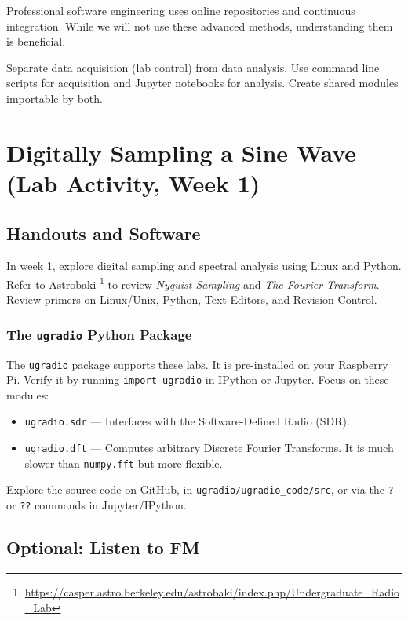 \documentclass[11pt,preprint]{aastex}
\begin{document}
\noindent
Professional software engineering uses online repositories and continuous integration.
While we will not use these advanced methods, understanding them is beneficial.

Separate data acquisition (lab control) from data analysis.
Use command line scripts for acquisition and Jupyter notebooks for analysis.
Create shared modules importable by both.


\section{Digitally Sampling a Sine Wave (Lab Activity, Week 1)}
\label{nyquist}

\subsection{Handouts and Software}

\noindent
In week 1, explore digital sampling and spectral analysis using Linux and Python.
Refer to Astrobaki%
\footnote{\url{https://casper.astro.berkeley.edu/astrobaki/index.php/Undergraduate_Radio_Lab}}
to review {\it Nyquist Sampling} and {\it The Fourier Transform}.
Review primers on Linux/Unix, Python, Text Editors, and Revision Control.

\subsubsection{The {\tt ugradio} Python Package}

\noindent
The {\tt ugradio} package supports these labs.
It is pre-installed on your Raspberry Pi.
Verify it by running {\tt import ugradio} in IPython or Jupyter.
Focus on these modules:

\begin{itemize}
    \item {\tt ugradio.sdr} --- Interfaces with the Software-Defined
    Radio (SDR).
    \item {\tt ugradio.dft} --- Computes arbitrary Discrete Fourier Transforms.
    It is much slower than {\tt numpy.fft} but more flexible.
\end{itemize}

\noindent
Explore the source code on GitHub, in {\tt ugradio/ugradio\_code/src},
or via the {\tt ?} or {\tt ??} commands in Jupyter/IPython.

\subsection{Optional: Listen to FM}
\end{document}
